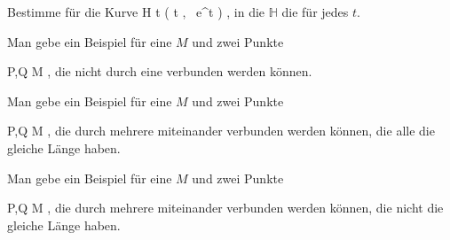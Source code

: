 {}
{

Bestimme für die Kurve
\maabbeledisp {\psi} {\R} { {\mathbb H}
} { t } { \left(  t   , \,  e^t                   \right)
} {,}
in die
${\mathbb H}$ die
für jedes $t$.

}
{} {}

{}
{

Man gebe ein Beispiel für eine
$M$ und zwei Punkte

\mavergleichskette
{\vergleichskette
{ P,Q
}
{ \in }{ M
}
{  }{
}
{    }{
}
{   }{
}
}
{}{}{,}
die nicht durch eine
verbunden werden können.

}
{} {}

{}
{

Man gebe ein Beispiel für eine
$M$ und zwei Punkte

\mavergleichskette
{\vergleichskette
{ P,Q
}
{ \in }{ M
}
{  }{
}
{    }{
}
{   }{
}
}
{}{}{,}
die durch mehrere
miteinander verbunden werden können, die alle die gleiche Länge haben.

}
{} {}

{}
{

Man gebe ein Beispiel für eine
$M$ und zwei Punkte

\mavergleichskette
{\vergleichskette
{ P,Q
}
{ \in }{ M
}
{  }{
}
{    }{
}
{   }{
}
}
{}{}{,}
die durch mehrere
miteinander verbunden werden können, die nicht die gleiche Länge haben.

}
{} {}

